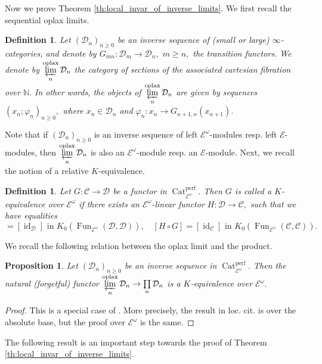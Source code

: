 \documentclass[11pt,leqno]{amsart}
\newtheorem{defi}[theo]{Definition}
\newtheorem{prop}[theo]{Proposition}
\numberwithin{equation}{section}
\def\N{\mathbb{N}}
\newcommand{\prolim}[1][]{\mathop{\varprojlim}\limits_{#1}}
\newcommand{\prodd}[1][]{\mathop{\prod}\limits_{#1}}
\newcommand{\oplax}{\operatorname{oplax}}
\newcommand{\Cat}{\operatorname{Cat}}
\newcommand{\cD}{{\mathcal D}}
\newcommand{\cC}{{\mathcal C}}
\newcommand{\cE}{{\mathcal E}}
\newcommand{\Fun}{\operatorname{Fun}}
\newcommand{\perf}{\operatorname{perf}}
\newcommand{\id}{\operatorname{id}}
\begin{document}
Now we prove Theorem \ref{th:local_invar_of_inverse_limits}. We first recall the sequential oplax limits.

\begin{defi}
Let $(\cD_n)_{n\geq 0}$ be an inverse sequence of (small or large) $\infty$-categories, and denote by $G_{mn}:\cD_m\to\cD_n,$ $m\geq n,$ the transition functors. We denote by $\prolim[n]^{\oplax}\cD_n$ the category of sections of the associated cartesian fibration over $\N.$ In other words, the objects of $\prolim[n]^{\oplax}\cD_n$ are given by sequences $(x_n;\varphi_n)_{n\geq 0},$ where $x_n\in\cD_n$ and $\varphi_n:x_n\to G_{n+1,n}(x_{n+1}).$
\end{defi}

Note that if $(\cD_n)_{n\geq 0}$ is an inverse sequence of left $\cE^{\omega}$-modules resp. left $\cE$-modules, then $\prolim[n]^{\oplax}\cD_n$ is also an $\cE^{\omega}$-module resp. an $\cE$-module. Next, we recall the notion of a relative $K$-equivalence.

\begin{defi}\label{def:K-equivalence}
Let $G:\cC\to\cD$ be a functor in $\Cat_{\cE^{\omega}}^{\perf}.$ Then $G$ is called a $K$-equivalence over $\cE^{\omega}$ if there exists an $\cE^{\omega}$-linear functor $H:\cD\to\cC,$ such that we have equalities
\begin{equation*}
[G\circ H]=[\id_{\cD}]\text{ in }K_0(\Fun_{\cE^{\omega}}(\cD,\cD)),\quad [H\circ G]=[\id_{\cC}]\text{ in }K_0(\Fun_{\cE^{\omega}}(\cC,\cC)).
\end{equation*}
\end{defi}

We recall the following relation between the oplax limit and the product.

\begin{prop}\label{prop:oplax_limit_K_equiv}
Let $(\cD_n)_{n\geq 0}$ be an inverse sequence in $\Cat_{\cE^{\omega}}^{\perf}.$ Then the natural (forgetful) functor $\prolim[n]^{\oplax}\cD_n\to\prodd[n]\cD_n$ is a $K$-equivalence over $\cE^{\omega}.$
\end{prop}

\begin{proof}
This is a special case of \cite[Proposition 4.29]{E24}. More precisely, the result in loc. cit. is over the absolute base, but the proof over $\cE^{\omega}$ is the same.  
\end{proof}

The following result is an important step towards the proof of Theorem \ref{th:local_invar_of_inverse_limits}.
\end{document}
